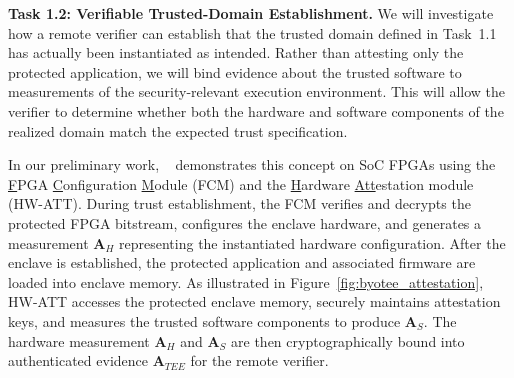 \textbf{Task 1.2: Verifiable Trusted-Domain Establishment.}
We will investigate how a remote verifier can establish that the trusted domain defined in Task~1.1 has actually been instantiated as intended.
Rather than attesting only the protected application, we will bind evidence about the trusted software to measurements of the security-relevant execution environment.
This will allow the verifier to determine whether both the hardware and software components of the realized domain match the expected trust specification.


In our preliminary work, \byotee~\cite{armanuzzaman2024building} demonstrates this concept on SoC FPGAs using the \underline{F}PGA \underline{C}onfiguration \underline{M}odule (FCM) and the \underline{H}ardware \underline{Att}estation module (HW-ATT).
During trust establishment, the FCM verifies and decrypts the protected FPGA bitstream, configures the enclave hardware, and generates a measurement $\mathbf{A}_H$ representing the instantiated hardware configuration.
After the enclave is established, the protected application and associated firmware are loaded into enclave memory.
As illustrated in Figure~\ref{fig:byotee_attestation}, HW-ATT accesses the protected enclave memory, securely maintains attestation keys, and measures the trusted software components to produce $\mathbf{A}_S$.
The hardware measurement $\mathbf{A}_H$  and $\mathbf{A}_S$ are then cryptographically bound into authenticated evidence \textbf{$\mathbf{A}_{TEE}$} for the remote verifier.

